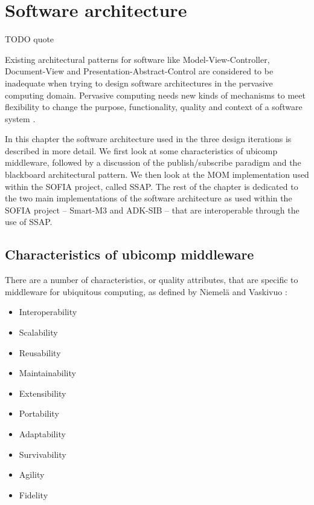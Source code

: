\chapter{Software architecture}
\label{SoftwareArchitecture}

TODO quote


Existing architectural patterns for software like Model-View-Controller, Document-View and Presentation-Abstract-Control are considered to be inadequate when trying to design software architectures in the pervasive computing domain. Pervasive computing needs new kinds of mechanisms to meet flexibility to change the purpose, functionality, quality and context of a software system \cite{Niemela2004}.

In this chapter the software architecture used in the three design iterations is described in more detail. We first look at some characteristics of ubicomp middleware, followed by a discussion of the publish/subscribe paradigm and the blackboard architectural pattern. We then look at the \ac{MOM} implementation used within the \ac{SOFIA} project, called \ac{SSAP}. The rest of the chapter is dedicated to the two main implementations of the software architecture as used within the \ac{SOFIA} project -- Smart-M3 and ADK-SIB -- that are interoperable through the use of \ac{SSAP}.


\section{Characteristics of ubicomp middleware}

There are a number of characteristics, or quality attributes, that are specific to middleware for ubiquitous computing, as defined by Niemel\"a and Vaskivuo \cite{Niemela2004}:

\begin{itemize}
	\item Interoperability
	\item Scalability 
	\item Reusability
	\item Maintainability
	\item Extensibility
	\item Portability
	\item Adaptability
	\item Survivability
	\item Agility
	\item Fidelity
\end{itemize} 

